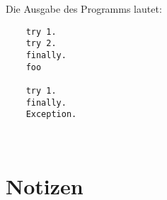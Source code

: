 \noindent
Die Ausgabe des Programms lautet:


\noindent
\begin{verbatim}
    try 1.
    try 2.
    finally.
    foo

    try 1.
    finally.
    Exception.
\end{verbatim}\\

\newpage











\newpage
\section*{Notizen}

\newpage
